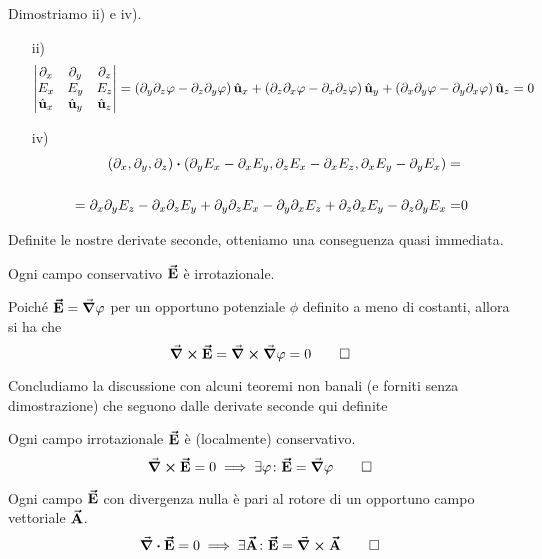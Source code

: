 \begin{demonstration}
	Dimostriamo ii) e iv).
	\begin{itemize}
		\item[ii)]
		\begin{equation*}
			\begin{vmatrix}
				\partial_x & \partial_y & \partial_z\\
				E_x & E_y & E_z\\
				\hat{\mathbf{u}}_x & \hat{\mathbf{u}}_y & \hat{\mathbf{u}}_z
			\end{vmatrix}=\left(\partial_y\partial_z\varphi-\partial_z\partial_y\varphi\right)\hat{\mathbf{u}}_x+\left(\partial_z\partial_x\varphi-\partial_x\partial_z\varphi\right)\hat{\mathbf{u}}_y+\left(\partial_x\partial_y\varphi-\partial_y\partial_x\varphi\right)\hat{\mathbf{u}}_z=0
		\end{equation*}
		\item[iv)]
		\begin{align*}
			\left(\partial_x,\partial_y,\partial_z\right)\vdot(\partial_yE_x-\partial_xE_y,\partial_zE_x-\partial_xE_z,\partial_xE_y-\partial_yE_x)=&\\
			\\=\partial_x\partial_yE_z-\partial_x\partial_zE_y+\partial_y\partial_zE_x-\partial_y\partial_xE_z+\partial_z\partial_xE_y-\partial_z\partial_yE_x=&0
		\end{align*}\qedhere
	\end{itemize}
\end{demonstration}
Definite le nostre derivate seconde, otteniamo una conseguenza quasi immediata.
\begin{proposition}
	Ogni campo conservativo $\vb*{\va{E}}$ è irrotazionale.
\end{proposition}
\begin{demonstration}
	Poiché $\vb*{\va{E}}=\grad{\varphi}$ per un opportuno potenziale $\phi$ definito a meno di costanti, allora si ha che
	\begin{equation*}
		\curl{\vb*{\va{E}}}=\curl{\grad{\varphi}}=0\qedhere
	\end{equation*}
\end{demonstration}
Concludiamo la discussione con alcuni teoremi non banali (e forniti senza dimostrazione) che seguono dalle derivate seconde qui definite
\begin{theoremaqed}
	Ogni campo irrotazionale $\vb*{\va{E}}$ è (localmente) conservativo.
	\begin{equation*}
		\curl{\vb*{\va{E}}}=0\implies \exists \varphi\colon \vb*{\va{E}}=\grad{\varphi}\qedhere
	\end{equation*}
\end{theoremaqed}
\begin{theoremaqed}
	Ogni campo $\vb*{\va{E}}$ con divergenza nulla è pari al rotore di un opportuno campo vettoriale $\vb*{\va{A}}$.
	\begin{equation*}
		\div{\vb*{\va{E}}}=0\implies \exists \vb*{\va{A}}\colon \vb*{\va{E}}=\curl{\vb*{\va{A}}}\qedhere
	\end{equation*}
\end{theoremaqed}
